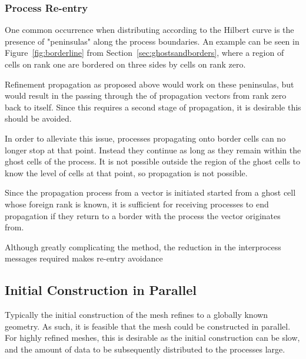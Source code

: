 \documentclass[twoside]{IIBproject}
\numberwithin{figure}{section}
\begin{document}
        \subsubsection{Process Re-entry} %
            \label{sec:parprop-reentry}

            One common occurrence when distributing according to the Hilbert curve is the presence of "peninsulas" along the process boundaries. An example can be seen in Figure~\ref{fig:borderline} from Section~\ref{sec:ghostsandborders}, where a region of cells on rank one are bordered on three sides by cells on rank zero. 

            Refinement propagation as proposed above would work on these peninsulas, but would result in the passing through the of propagation vectors from rank zero back to itself. Since this requires a second stage of propagation, it is desirable this should be avoided.

            In order to alleviate this issue, processes propagating onto border cells can no longer stop at that point. Instead they continue as long as they remain within the ghost cells of the process. It is not possible outside the region of the ghost cells to know the level of cells at that point, so propagation is not possible. 

            Since the propagation process from a vector is initiated started from a ghost cell whose foreign rank is known, it is sufficient for receiving processes to end propagation if they return to a border with the process the vector originates from. 

            Although greatly complicating the method, the reduction in the interprocess messages required makes re-entry avoidance 




    \subsection{Initial Construction in Parallel} %
        \label{sec:parinit}

        Typically the initial construction of the mesh refines to a globally known geometry. As such, it is feasible that the mesh could be constructed in parallel. For highly refined meshes, this is desirable as the initial construction can be slow, and the amount of data to be subsequently distributed to the processes large. 
\end{document}
